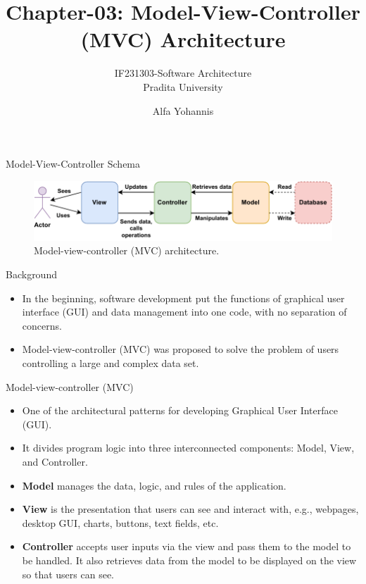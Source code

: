 \documentclass{beamer}
\title{Chapter-03: Model-View-Controller (MVC) Architecture}
\subtitle{IF231303-Software Architecture\\Pradita University}
\author{Alfa Yohannis}
\begin{document}
\begin{frame}[plain]
    \maketitle
\end{frame}

\begin{frame}{Model-View-Controller Schema}
\begin{figure}[h]
    \centering
    \includegraphics[width=\textwidth]{mvc}
    \caption{Model-view-controller (MVC) architecture.}
    \label{fig:mvc}
\end{figure}
\end{frame}

\begin{frame}{Background}
\begin{itemize}
\item In the beginning, software development put the functions of graphical user interface (GUI) and data management into one code, with no separation of concerns.
\item Model-view-controller (MVC) was proposed to solve the problem of users controlling a large and complex data set.
\end{itemize}
\end{frame}

\begin{frame}{Model-view-controller (MVC)}
\begin{itemize}
\item One of the architectural patterns for developing Graphical User Interface (GUI).
\item It divides program logic into three interconnected components: Model, View, and Controller.
\item \textbf{Model} manages the data, logic, and rules of the application.
\item \textbf{View} is the presentation that users can see and interact with, e.g., webpages, desktop GUI, charts, buttons, text fields, etc.
\item \textbf{Controller} accepts user inputs via the view and pass them to the model to be handled. It also retrieves data from the model to be displayed on the view so that users can see.

\end{itemize}
\end{frame}
\end{document}
